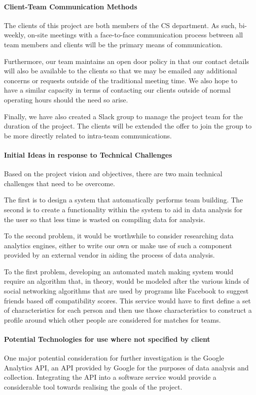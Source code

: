 \documentclass[12pt]{article}
\begin{document}
\paragraph{Client-Team Communication Methods}
The clients of this project are both members of the CS department. As such, bi-weekly, on-site meetings with a face-to-face communication process between all team members and clients will be the primary means of communication.

Furthermore, our team maintains an open door policy in that our contact details will also be available to the clients so that we may be emailed any additional concerns or requests outside of the traditional meeting time. We also hope to have a similar capacity in terms of contacting our clients outside of normal operating hours should the need so arise.

Finally, we have also created a Slack group to manage the project team for the duration of the project. The clients will be extended the offer to join the group to be more directly related to intra-team communications.
\paragraph{Initial Ideas in response to Technical Challenges}
Based on the project vision and objectives, there are two main technical challenges that need to be overcome.

The first is to design a system that automatically performs team building. The second is to create a functionality within the system to aid in data analysis for the user so that less time is wasted on compiling data for analysis.

To the second problem, it would be worthwhile to consider researching data analytics engines, either to write our own or make use of such a component provided by an external vendor in aiding the process of data analysis.

To the first problem, developing an automated match making system would require an algorithm that, in theory, would be modeled after the various kinds of social networking algorithms that are used by programs like Facebook to suggest friends based off compatibility scores. This service would have to first define a set of characteristics for each person and then use those characteristics to construct a profile around which other people are considered for matches for teams.
\paragraph{Potential Technologies for use where not specified by client}
One major potential consideration for further investigation is the Google Analytics API, an API provided by Google for the purposes of data analysis and collection. Integrating the API into a software service would provide a considerable tool towards realising the goals of the project.
\end{document}
